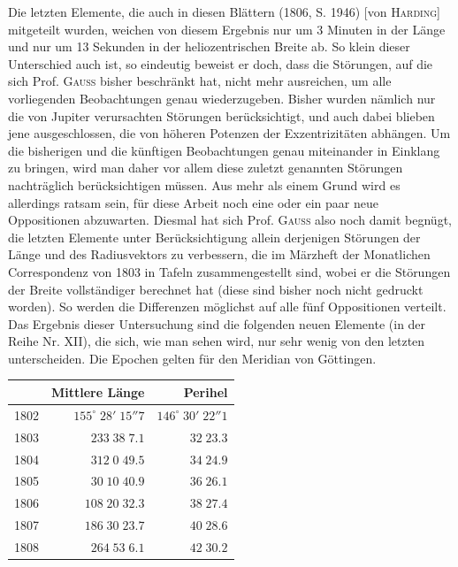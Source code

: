 \par\indent Die letzten Elemente, die auch in diesen Blättern (1806, S. 1946) [von \textsc{Harding}] mitgeteilt wurden, weichen von diesem Ergebnis nur um 3 Minuten in der Länge und nur um 13 Sekunden in der heliozentrischen Breite ab. So klein dieser Unterschied auch ist, so eindeutig beweist er doch, dass die Störungen, auf die sich Prof. \textsc{Gauss} bisher beschränkt hat, nicht mehr ausreichen, um alle vorliegenden Beobachtungen genau wiederzugeben. Bisher wurden nämlich nur die von Jupiter verursachten Störungen berücksichtigt, und auch dabei blieben jene ausgeschlossen, die von höheren Potenzen der Exzentrizitäten abhängen. Um die bisherigen und die künftigen Beobachtungen genau miteinander in Einklang zu bringen, wird man daher vor allem diese zuletzt genannten Störungen nachträglich berücksichtigen müssen. Aus mehr als einem Grund wird es allerdings ratsam sein, für diese Arbeit noch eine oder ein paar neue Oppositionen abzuwarten. Diesmal hat sich Prof. \textsc{Gauss} also noch damit begnügt, die letzten Elemente unter Berücksichtigung allein derjenigen Störungen der Länge und des Radiusvektors zu verbessern, die im Märzheft der Monatlichen Correspondenz von 1803 in Tafeln zusammengestellt sind, wobei er die Störungen der Breite vollständiger berechnet hat (diese sind bisher noch nicht gedruckt worden). So werden die Differenzen möglichst auf alle fünf Oppositionen verteilt. Das Ergebnis dieser Untersuchung sind die folgenden neuen Elemente (in der Reihe Nr. XII), die sich, wie man sehen wird, nur sehr wenig von den letzten unterscheiden. Die Epochen gelten für den Meridian von Göttingen.

\begin{center}\fontsize{10}{12}\selectfont\setlength{\tabcolsep}{3pt}\renewcommand{\arraystretch}{1.15}\begin{tabular}{lrr}
& Mittlere Länge & Perihel\\\hline
1802 & $155^\circ\;28'\;15''7$ & $146^\circ\;30'\;22''1$\\
1803 & $233\;38\;7.1$ & $32\;23.3$\\
1804 & $312\;0\;49.5$ & $34\;24.9$\\
1805 & $30\;10\;40.9$ & $36\;26.1$\\
1806 & $108\;20\;32.3$ & $38\;27.4$\\
1807 & $186\;30\;23.7$ & $40\;28.6$\\
1808 & $264\;53\;6.1$ & $42\;30.2$\\
\end{tabular}\end{center}

